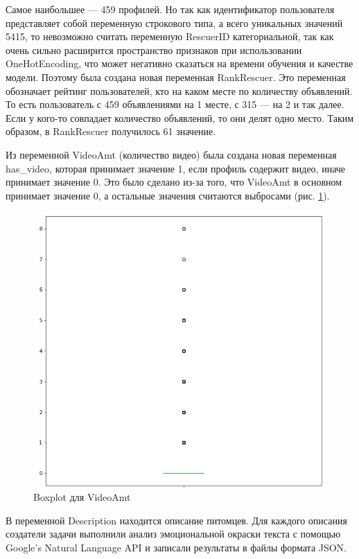 \documentclass[14pt]{mmcs_article}
\begin{document}
Самое наибольшее --- 459 профилей. Но так как идентификатор пользователя представляет собой переменную строкового типа, а всего уникальных значений 5415, то невозможно считать переменную RescuerID категориальной, так как очень сильно расширится пространство признаков при использовании OneHotEncoding, что может негативно сказаться на времени обучения и качестве модели. Поэтому была создана новая переменная RankRescuer. Это переменная обозначает рейтинг пользователей, кто на каком месте по количеству объявлений. То есть пользователь с 459 объявлениями на 1 месте, с 315 --- на 2 и так далее. Если у кого-то совпадает количество объявлений, то они делят одно место. Таким образом, в RankRescuer получилось 61 значение.

Из переменной VideoAmt (количество видео) была создана новая переменная has\_video, которая принимает значение 1, если профиль содержит видео, иначе принимает значение 0. Это было сделано из-за того, что VideoAmt в основном принимает значение 0, а остальные значения считаются выбросами (рис. \ref{analyse:videooutlier}).

\begin{figure}[H]
	\centering
	\includegraphics[scale=0.6]{videooutlier.png}
	\caption{Boxplot для VideoAmt}\label{analyse:videooutlier}
\end{figure}

В переменной Description находится описание питомцев. Для каждого описания создатели задачи выполнили анализ эмоциональной окраски текста с помощью Google’s Natural Language API и записали результаты в файлы формата JSON. 
\end{document}
